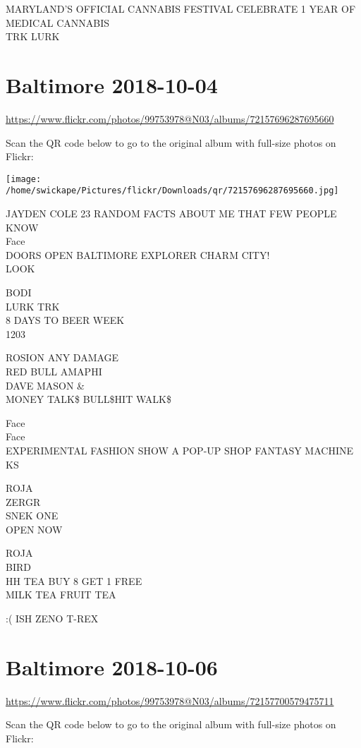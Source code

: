 \documentclass[10pt,letterpaper]{article}
\begin{document}
MARYLAND'S OFFICIAL CANNABIS FESTIVAL CELEBRATE 1 YEAR OF MEDICAL CANNABIS\\
TRK LURK


\section*{Baltimore 2018-10-04}

\url{https://www.flickr.com/photos/99753978@N03/albums/72157696287695660}

Scan the QR code below to go to the original album with full-size photos on Flickr:

\texttt{[image: /home/swickape/Pictures/flickr/Downloads/qr/72157696287695660.jpg]}


JAYDEN COLE 23 RANDOM FACTS ABOUT ME THAT FEW PEOPLE KNOW\\
Face\\
DOORS OPEN BALTIMORE EXPLORER CHARM CITY!\\
LOOK

BODI\\
LURK TRK\\
8 DAYS TO BEER WEEK\\
1203

ROSION ANY DAMAGE\\
RED BULL AMAPHI\\
DAVE MASON \&\\
MONEY TALK\$ BULL\$HIT WALK\$

Face\\
Face\\
EXPERIMENTAL FASHION SHOW A POP{-}UP SHOP FANTASY MACHINE\\
KS

ROJA\\
ZERGR\\
SNEK ONE\\
OPEN NOW

ROJA\\
BIRD\\
HH TEA BUY 8 GET 1 FREE\\
MILK TEA FRUIT TEA

:( ISH ZENO T{-}REX


\section*{Baltimore 2018-10-06}

\url{https://www.flickr.com/photos/99753978@N03/albums/72157700579475711}

Scan the QR code below to go to the original album with full-size photos on Flickr:
\end{document}
